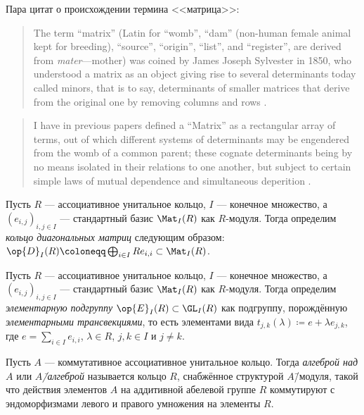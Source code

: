 \documentclass[
	extrafontsizes,
	11pt,
	hyphens,
]{memoir}
\begin{document}
\begin{remark}
Пара цитат о происхождении термина <<матрица>>:
\begin{quote}
\textenglish{The term ``matrix'' (Latin for ``womb'', ``dam'' (non-human female animal kept for breeding), ``source'', ``origin'', ``list'', and ``register'', are derived from \emph{mater}---mother) was coined by James Joseph Sylvester in 1850, who understood a matrix as an object giving rise to several determinants today called minors, that is to say, determinants of smaller matrices that derive from the original one by removing columns and rows \cite{wiki_matrix_history}.}
\end{quote}
\begin{quote}
\textenglish{I have in previous papers defined a ``Matrix'' as a rectangular array of terms, out of which different systems of determinants may be engendered from the womb of a common parent; these cognate determinants being by no means isolated in their relations to one another, but subject to certain simple laws of mutual dependence and simultaneous deperition \autocite[247]{sylvester_1851}.}
\end{quote}
\end{remark}

\begin{definition}
Пусть \(R\) --- ассоциативное унитальное кольцо, \(I\) --- конечное множество, а \((e_{i,j})_{i,j \in I}\) --- стандартный базис \(\Mat_I(R)\) как \(R\)-мо\-ду\-ля.
Тогда определим \emph{кольцо диагональных матриц} следующим образом: \(\op{D}_I(R) \coloneqq \bigoplus_{i \in I} R e_{i,i} \subset \Mat_I(R)\).
\end{definition}

\begin{definition}
Пусть \(R\) --- ассоциативное унитальное кольцо, \(I\) --- конечное множество, а \((e_{i,j})_{i,j \in I}\) --- стандартный базис \(\Mat_I(R)\) как \(R\)-мо\-ду\-ля.
Тогда определим \emph{элементарную подгруппу} \(\op{E}_I(R) \subset \GL_I(R)\) как подгруппу, порождённую \emph{элементарными трансвекциями}, то есть элементами вида \(t_{j,k}(\lambda) \coloneqq e + \lambda e_{j,k}\), где \(e = \sum_{i \in I} e_{i,i}\), \(\lambda \in R\), \(j,k \in I\) и \(j \neq k\).
\end{definition}

\begin{definition}
Пусть \(A\) --- коммутативное ассоциативное унитальное кольцо.
Тогда \emph{алгеброй над \(A\)} или \emph{\(A\)\=/алгеброй} называется кольцо \(R\), снабжённое структурой \(A\)\=/модуля, такой что действия элементов \(A\) на аддитивной абелевой группе \(R\) коммутируют с эндоморфизмами левого и правого умножения на элементы \(R\).
\end{definition}
\end{document}
